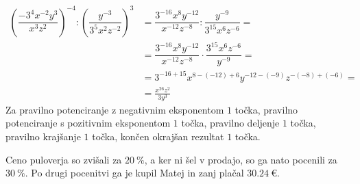 \documentclass[addpoints]{exam}
\begin{document}
\begin{questions}
\begin{parts}
            \begin{solution}[7cm]
                \begin{align*}
                    \left(\dfrac{-3^4x^{-2}y^3}{x^3z^2}\right)^{-4} : \left(\dfrac{y^{-3}}{3^5x^2z^{-2}}\right)^3 &= \dfrac{3^{-16}x^{8}y^{-12}}{x^{-12}z^{-8}} : \dfrac{y^{-9}}{3^{15}x^6z^{-6}}= \\
                                                                                                                    &= \dfrac{3^{-16}x^{8}y^{-12}}{x^{-12}z^{-8}} \cdot \dfrac{3^{15}x^6z^{-6}}{y^{-9}}= \\
                                                                                                                    &= 3^{-16+15}x^{8-(-12)+6}y^{-12-(-9)}z^{-(-8)+(-6)}= \\
                                                                                                                    &=\frac{x^{26}z^2}{3y^3}
                \end{align*}
                Za pravilno potenciranje z negativnim eksponentom $1$ točka, pravilno potenciranje s pozitivnim eksponentom $1$ točka, pravilno deljenje $1$ točka, pravilno krajšanje $1$ točka, končen okrajšan rezultat $1$ točka.
            \end{solution}
    
    
        \end{parts}
   
   
   
   



        \question
        Ceno puloverja so zvišali za $20~\%$, a ker ni šel v prodajo, so ga nato pocenili za $30~\%$.
        Po drugi pocenitvi ga je kupil Matej in zanj plačal $30.24~\euro$.

\end{questions}
\end{document}
